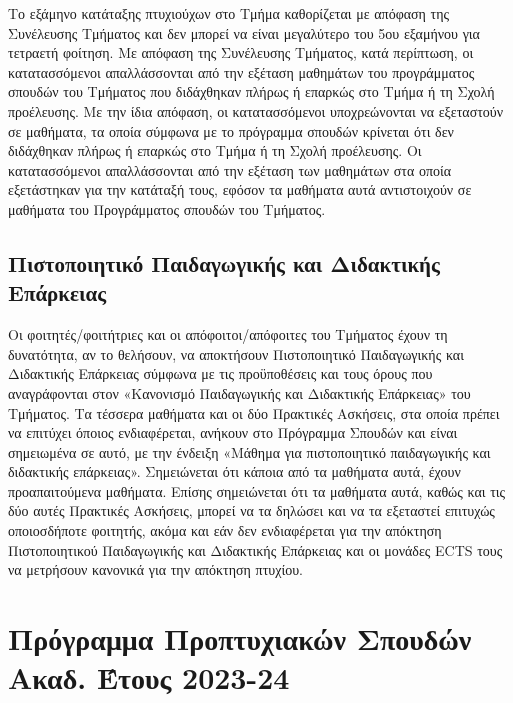 Το εξάμηνο κατάταξης πτυχιούχων στο Τμήμα καθορίζεται με απόφαση της
Συνέλευσης Τμήματος και δεν μπορεί να είναι μεγαλύτερο του 5ου εξαμήνου
για τετραετή φοίτηση. Με απόφαση της Συνέλευσης Τμήματος, κατά
περίπτωση, οι κατατασσόμενοι απαλλάσσονται από την εξέταση μαθημάτων του
προγράμματος σπουδών του Τμήματος που διδάχθηκαν πλήρως ή επαρκώς στο
Τμήμα ή τη Σχολή προέλευσης. Με την ίδια απόφαση, οι κατατασσόμενοι
υποχρεώνονται να εξεταστούν σε μαθήματα, τα οποία σύμφωνα με το
πρόγραμμα σπουδών κρίνεται ότι δεν διδάχθηκαν πλήρως ή επαρκώς στο Τμήμα
ή τη Σχολή προέλευσης. Οι κατατασσόμενοι απαλλάσσονται από την εξέταση
των μαθημάτων στα οποία εξετάστηκαν για την κατάταξή τους, εφόσον τα
μαθήματα αυτά αντιστοιχούν σε μαθήματα του Προγράμματος σπουδών του
Τμήματος.

\hypertarget{ux3c0ux3b9ux3c3ux3c4ux3bfux3c0ux3bfux3b9ux3b7ux3c4ux3b9ux3baux3cc-ux3c0ux3b1ux3b9ux3b4ux3b1ux3b3ux3c9ux3b3ux3b9ux3baux3aeux3c2-ux3baux3b1ux3b9-ux3b4ux3b9ux3b4ux3b1ux3baux3c4ux3b9ux3baux3aeux3c2-ux3b5ux3c0ux3acux3c1ux3baux3b5ux3b9ux3b1ux3c2}{%
\subsection{Πιστοποιητικό Παιδαγωγικής και Διδακτικής
Επάρκειας}\label{ux3c0ux3b9ux3c3ux3c4ux3bfux3c0ux3bfux3b9ux3b7ux3c4ux3b9ux3baux3cc-ux3c0ux3b1ux3b9ux3b4ux3b1ux3b3ux3c9ux3b3ux3b9ux3baux3aeux3c2-ux3baux3b1ux3b9-ux3b4ux3b9ux3b4ux3b1ux3baux3c4ux3b9ux3baux3aeux3c2-ux3b5ux3c0ux3acux3c1ux3baux3b5ux3b9ux3b1ux3c2}}

Οι φοιτητές/φοιτήτριες και οι απόφοιτοι/απόφοιτες του Τμήματος έχουν τη
δυνατότητα, αν το θελήσουν, να αποκτήσουν Πιστοποιητικό Παιδαγωγικής και
Διδακτικής Επάρκειας σύμφωνα με τις προϋποθέσεις και τους όρους που
αναγράφονται στον «Κανονισμό Παιδαγωγικής και Διδακτικής Επάρκειας» του
Τμήματος. Τα τέσσερα μαθήματα και οι δύο Πρακτικές Ασκήσεις, στα οποία
πρέπει να επιτύχει όποιος ενδιαφέρεται, ανήκουν στο Πρόγραμμα Σπουδών
και είναι σημειωμένα σε αυτό, με την ένδειξη «Μάθημα για πιστοποιητικό
παιδαγωγικής και διδακτικής επάρκειας». Σημειώνεται ότι κάποια από τα
μαθήματα αυτά, έχουν προαπαιτούμενα μαθήματα. Επίσης σημειώνεται ότι τα
μαθήματα αυτά, καθώς και τις δύο αυτές Πρακτικές Ασκήσεις, μπορεί να τα
δηλώσει και να τα εξεταστεί επιτυχώς οποιοσδήποτε φοιτητής, ακόμα και
εάν δεν ενδιαφέρεται για την απόκτηση Πιστοποιητικού Παιδαγωγικής και
Διδακτικής Επάρκειας και οι μονάδες ECTS τους να μετρήσουν κανονικά για
την απόκτηση πτυχίου.

\hypertarget{ux3c0ux3c1ux3ccux3b3ux3c1ux3b1ux3bcux3bcux3b1-ux3c0ux3c1ux3bfux3c0ux3c4ux3c5ux3c7ux3b9ux3b1ux3baux3ceux3bd-ux3c3ux3c0ux3bfux3c5ux3b4ux3ceux3bd-ux3b1ux3baux3b1ux3b4.-ux3adux3c4ux3bfux3c5ux3c2-2023-24}{%
\section{Πρόγραμμα Προπτυχιακών Σπουδών Ακαδ. Έτους
2023-24}\label{ux3c0ux3c1ux3ccux3b3ux3c1ux3b1ux3bcux3bcux3b1-ux3c0ux3c1ux3bfux3c0ux3c4ux3c5ux3c7ux3b9ux3b1ux3baux3ceux3bd-ux3c3ux3c0ux3bfux3c5ux3b4ux3ceux3bd-ux3b1ux3baux3b1ux3b4.-ux3adux3c4ux3bfux3c5ux3c2-2023-24}}

